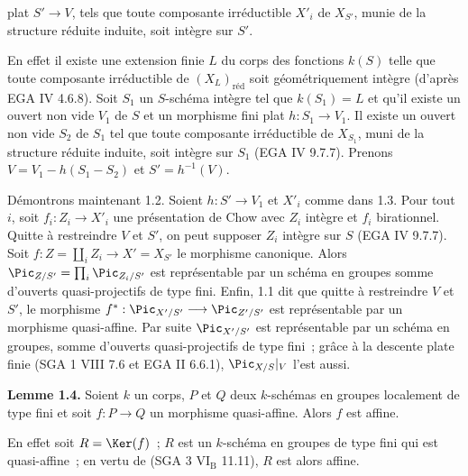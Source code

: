 plat \(S'\to V\), tels que toute composante irréductible \(X'_i\) de \(X_{S'}\), munie de la structure réduite induite, soit intègre sur \(S'\).

En effet il existe une extension finie \(L\) du corps des fonctions \(k(S)\) telle que toute composante irréductible de \((X_L)_{\text{réd}}\) soit géométriquement intègre (d'après EGA IV 4.6.8). Soit \(S_1\) un \(S\)-schéma intègre tel que \(k(S_1)=L\) et qu'il existe un ouvert non vide \(V_1\) de \(S\) et un morphisme fini plat \(h:S_1\to V_1\). Il existe un ouvert non vide \(S_2\) de \(S_1\) tel que toute composante irréductible de \(X_{S_1}\), muni de la structure réduite induite, soit intègre sur \(S_1\) (EGA IV 9.7.7). Prenons \(V=V_1-h(S_1-S_2)\) et \(S'=h^{-1}(V)\).

Démontrons maintenant 1.2. Soient \(h:S'\to V_1\) et \(X'_i\) comme dans 1.3. Pour tout \(i\), soit \(f_i:Z_i\to X'_i\) une présentation de Chow avec \(Z_i\) intègre et \(f_i\) birationnel. Quitte à restreindre \(V\) et \(S'\), on peut supposer \(Z_i\) intègre sur \(S\) (EGA IV 9.7.7). Soit \(f:Z=\coprod_i Z_i\longrightarrow X'=X_{S'}\) le morphisme canonique. Alors \(\Pic_{Z/S'}=\prod_i\Pic_{Z_i/S'}\) est représentable par un schéma en groupes somme d'ouverts quasi-projectifs de type fini. Enfin, 1.1 dit que quitte à restreindre \(V\) et \(S'\), le morphisme \(f^*:\Pic_{X'/S'}\longrightarrow \Pic_{Z'/S'}\) est représentable par un morphisme quasi-affine. Par suite \(\Pic_{X'/S'}\) est représentable par un schéma en groupes, somme d'ouverts quasi-projectifs de type fini~; grâce à la descente plate finie (SGA 1 VIII 7.6 et EGA II 6.6.1), \(\Pic_{X/S}|_V\) l'est aussi.

\textbf{Lemme 1.4.} Soient \(k\) un corps, \(P\) et \(Q\) deux \(k\)-schémas en groupes localement de type fini et soit \(f:P\to Q\) un morphisme quasi-affine. Alors \(f\) est affine.

En effet soit \(R=\Ker(f)\)~; \(R\) est un \(k\)-schéma en groupes de type fini qui est quasi-affine~; en vertu de (SGA 3 \(\mathrm{VI}_{\mathrm B}\) 11.11), \(R\) est alors affine.
